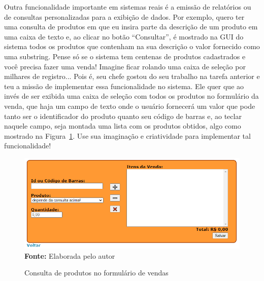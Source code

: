 \begin{desafioSemArquivo}{}{}{}
    Outra funcionalidade importante em sistemas reais é a emissão de relatórios ou de consultas personalizadas para a exibição de dados. Por exemplo, quero ter uma consulta de produtos em que eu insira parte da descrição de um produto em uma caixa de texto e, ao clicar no botão ``Consultar'', é mostrado na GUI do sistema todos os produtos que contenham na sua descrição o valor fornecido como uma substring. Pense só se o sistema tem centenas de produtos cadastrados e você precisa fazer uma venda! Imagine ficar rolando uma caixa de seleção por milhares de registro... Pois é, seu chefe gostou do seu trabalho na tarefa anterior e teu a missão de implementar essa funcionalidade no sistema. Ele quer que ao invés de ser exibida uma caixa de seleção com todos os produtos no formulário da venda, que haja um campo de texto onde o usuário fornecerá um valor que pode tanto ser o identificador do produto quanto seu código de barras e, ao teclar  naquele campo, seja montada uma lista com os produtos obtidos, algo como mostrado na Figura~\ref{fig:cap08DesafioConsultaProduto}. Use sua imaginação e criatividade para implementar tal funcionalidade!
    
    \FloatBarrier
    \begin{figure}[!htbp]
        \centering
        \caption{Consulta de produtos no formulário de vendas}
        \includegraphics[scale=0.7]{imagens/cap08DesafioConsultaProduto}
        \\\textbf{Fonte:} Elaborada pelo autor
        \label{fig:cap08DesafioConsultaProduto}
    \end{figure}
    \FloatBarrier
\end{desafioSemArquivo}

